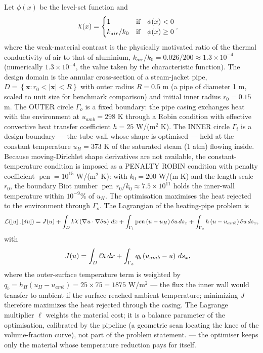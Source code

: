 \documentclass[preview]{standalone}
\let\oldcdot\cdot
\let\cdot\oldcdot
\begin{document}
Let $\phi(x)$ be the level-set function and
 \begin{align*}\raisebox{\depth}{$\chi$}(x) &= \begin{cases} 1 & \mbox{if}\quad \phi(x) < 0 \\ k_{air}/k_0 & \mbox{if}\quad \phi(x)  \ge 0 \end{cases},\end{align*}
where the weak-material contrast is the physically motivated ratio of the thermal conductivity of air to that of aluminium, $k_{air}/k_0 = 0.026/200 \approx 1.3 \times 10^{-4}$ (numerically $1.3 \times 10^{-4}$, the value taken by the characteristic function).
The design domain is the annular cross-section of a steam-jacket pipe, $D = \left\{ \mathbf x : r_0 < \left|\mathbf x\right| < R \right\}$ with outer radius $R = 0.5$ m (a pipe of diameter 1 m, scaled to unit size for benchmark comparison) and initial inner radius $r_0 = 0.15$ m.  The OUTER circle $\Gamma_o$ is a fixed boundary: the pipe casing exchanges heat with the environment at $u_{amb} = 298$ K through a Robin condition with effective convective heat transfer coefficient $h = 25$ W/(m$^{2}$ K).  The INNER circle $\Gamma_i$ is a design boundary — the tube wall whose shape is optimised — held at the constant temperature $u_H = 373$ K of the saturated steam (1 atm) flowing inside.  Because moving-Dirichlet shape derivatives are not available, the constant-temperature condition is imposed as a PENALTY ROBIN condition with penalty coefficient $\operatorname{pen} = 10^{15}$ W/(m$^{2}$ K): with $k_0 = 200$ W/(m K) and the length scale $r_0$, the boundary Biot number $\operatorname{pen}\, r_0 / k_0 \approx 7.5 \times 10^{11}$ holds the inner-wall temperature within $10^{-9}\%$ of $u_H$.  The optimisation maximises the heat rejected to the environment through $\Gamma_o$.
The Lagrangian of the heating-pipe problem is
\begin{dmath*}
\mathcal L(\left[ u\right],\left[ \delta u\right]) = J(u) +  \int_{D} k \raisebox{\depth}{$\chi$} \left(  \nabla u  \cdot  \nabla \delta u  \right) \,dx + \int_{\Gamma_i} \operatorname{pen} \left( u - u_{H}\right) \delta u \,ds_x + \int_{\Gamma_o} h \left( u - u_{amb}\right) \delta u \,ds_x ,
\end{dmath*}
with
\begin{align*}
J(u) &=  \int_{D} \ell \raisebox{\depth}{$\chi$} \,dx + \int_{\Gamma_o} q_b \left( u_{amb} - u\right) \,ds_x ,
 \end{align*}
where the outer-surface temperature term is weighted by $q_b = h_H \left( u_H - u_{amb}\right) = 25 \times 75 = 1875$ W/m$^{2}$ — the flux the inner wall would transfer to ambient if the surface reached ambient temperature; minimizing $J$ therefore maximizes the heat rejected through the casing.  The Lagrange multiplier $\ell$ weights the material cost; it is a balance parameter of the optimisation, calibrated by the pipeline (a geometric scan locating the knee of the volume-fraction curve), not part of the problem statement. — the optimiser keeps only the material whose temperature reduction pays for itself.
\end{document}
